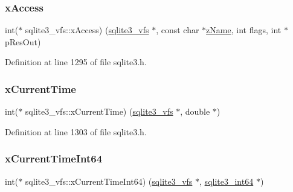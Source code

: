 \mbox{\label{structsqlite3__vfs_a3a5cc43f1b8a88747eb77db730ce4f69}} 
\subsubsection{\texorpdfstring{x\+Access}{xAccess}}
{\footnotesize\ttfamily int($\ast$ sqlite3\+\_\+vfs\+::x\+Access) (\mbox{\hyperlink{structsqlite3__vfs}{sqlite3\+\_\+vfs}} $\ast$, const char $\ast$\mbox{\hyperlink{structsqlite3__vfs_a0f06a27ac2201ea04c0623ef19e5d73e}{z\+Name}}, int flags, int $\ast$p\+Res\+Out)}



Definition at line 1295 of file sqlite3.\+h.

\mbox{\label{structsqlite3__vfs_a925aa81bcf67f2daf50ad59de850ef41}} 
\subsubsection{\texorpdfstring{x\+Current\+Time}{xCurrentTime}}
{\footnotesize\ttfamily int($\ast$ sqlite3\+\_\+vfs\+::x\+Current\+Time) (\mbox{\hyperlink{structsqlite3__vfs}{sqlite3\+\_\+vfs}} $\ast$, double $\ast$)}



Definition at line 1303 of file sqlite3.\+h.

\mbox{\label{structsqlite3__vfs_a2a344dbc5e4625343d992546fbff5421}} 
\subsubsection{\texorpdfstring{x\+Current\+Time\+Int64}{xCurrentTimeInt64}}
{\footnotesize\ttfamily int($\ast$ sqlite3\+\_\+vfs\+::x\+Current\+Time\+Int64) (\mbox{\hyperlink{structsqlite3__vfs}{sqlite3\+\_\+vfs}} $\ast$, \mbox{\hyperlink{sqlite3_8h_a0a4d3e6c1ad46f90e746b920ab6ca0d2}{sqlite3\+\_\+int64}} $\ast$)}



